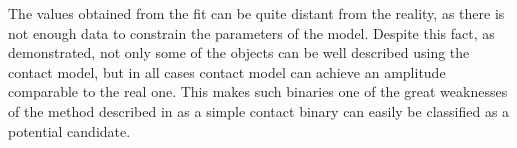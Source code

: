 \documentclass{pracalicmgr}
\begin{document}
The values obtained from the fit can be quite distant from the reality, as there is not enough data to constrain the parameters of the model.
Despite this fact, as demonstrated, not only some of the objects can be well described using the contact model, but in all cases contact model can achieve an amplitude comparable to the real one. This makes such binaries one of the great weaknesses of the method described
in \citet{gomel_search_2021-2} as a simple contact binary can easily be classified as a potential candidate.
 
\end{document}
